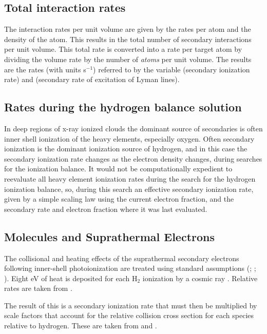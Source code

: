\subsection{Total interaction rates}

The interaction rates per unit volume are given by the rates per atom
and the density of the atom.  This results in the total number of secondary
interactions per unit volume.
This total rate is converted into a rate
per target atom by dividing the volume rate by the number of
\emph{atoms} per unit volume.
The results are the rates (with units s$^{-1}$) referred to by the
variable  (secondary ionization rate) and  (secondary rate of
excitation of Lyman lines).

\subsection{Rates during the hydrogen balance solution}

In deep regions of x-ray ionized clouds the dominant source of secondaries
is often inner shell ionization of the heavy elements, especially oxygen.
Often secondary ionization is the dominant ionization source of hydrogen,
and in this case the secondary ionization rate changes as the electron
density changes, during searches for the ionization balance.  It would not
be computationally expedient to reevaluate all heavy element ionization
rates during the search for the hydrogen ionization balance, so, during
this search an effective secondary ionization rate, given by a simple scaling
law using the current electron fraction, and the secondary rate and electron
fraction where it was last evaluated.

\subsection{Molecules and Suprathermal Electrons}

The collisional and heating effects of the suprathermal secondary
electrons following inner-shell photoionization are treated using standard
assumptions
(\citealp{Bergeron1971}; \citealp{Shull1985}; \citealp{Voit1991}).
Eight eV of heat is deposited for each H$_2$ ionization by a cosmic ray \citep{Tielens1985a}.
Relative rates are taken from \citet{Hollenbach1989}.

The result of this is a secondary ionization rate that must then be
multiplied by scale factors that account for the relative collision cross
section for each species relative to hydrogen.   These are taken from
\citep{Tielens1985a} and \citet{Hollenbach1989}.

